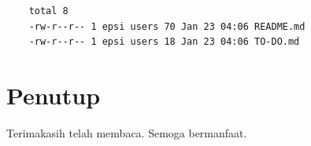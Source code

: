 \documentclass{article}
\begin{document}

\begin{lstlisting}[style=BashInputStyle]
    % ls -l
    total 8
    -rw-r--r-- 1 epsi users 70 Jan 23 04:06 README.md
    -rw-r--r-- 1 epsi users 18 Jan 23 04:06 TO-DO.md
\end{lstlisting}


\section{Penutup}

Terimakasih telah membaca.
Semoga bermanfaat.
\end{document}
